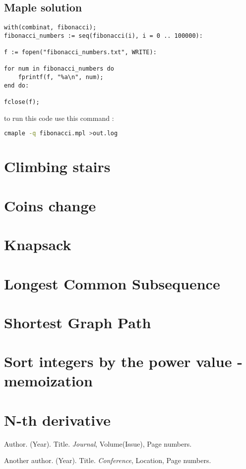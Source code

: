 \documentclass{article}
\begin{document}
\subsection{Maple solution}
\begin{lstlisting}[language=Maple]
with(combinat, fibonacci);
fibonacci_numbers := seq(fibonacci(i), i = 0 .. 100000):

f := fopen("fibonacci_numbers.txt", WRITE):

for num in fibonacci_numbers do
	fprintf(f, "%a\n", num);
end do:

fclose(f);
\end{lstlisting}

to run this code use this command :
\begin{lstlisting}[language=bash]
cmaple -q fibonacci.mpl >out.log
\end{lstlisting}


\section{Climbing stairs}

\section{Coins change}

\section{Knapsack}

\section{Longest Common Subsequence}

\section{Shortest Graph Path}

\section{Sort integers by the power value - memoization}

\section{N-th derivative}

\begin{thebibliography}{9}
Author. (Year). Title. \textit{Journal}, Volume(Issue), Page numbers.

Another author. (Year). Title. \textit{Conference}, Location, Page numbers.

\end{thebibliography}
\end{document}
